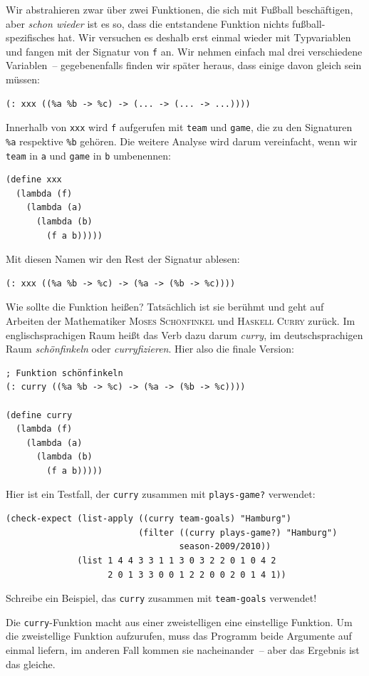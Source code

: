 Wir abstrahieren zwar über zwei Funktionen, die sich mit Fußball
beschäftigen, aber \emph{schon wieder} ist es so, dass die entstandene
Funktion nichts fußball-spezifisches hat.  Wir versuchen es deshalb
erst einmal wieder mit Typvariablen und fangen mit der Signatur von
\lstinline{f} an.  Wir nehmen einfach mal drei verschiedene
Variablen~-- gegebenenfalls finden wir später heraus, dass einige
davon gleich sein müssen:
%
\begin{lstlisting}
(: xxx ((%a %b -> %c) -> (... -> (... -> ...))))
\end{lstlisting}
%
Innerhalb von \lstinline{xxx} wird \lstinline{f} aufgerufen mit
\lstinline{team} und \lstinline{game}, die zu den Signaturen
\lstinline{%a} respektive \lstinline{%b} gehören.  Die weitere Analyse
wird darum vereinfacht, wenn wir \lstinline{team} in \lstinline{a} und
\lstinline{game} in \lstinline{b} umbenennen:
%
\begin{lstlisting}
(define xxx
  (lambda (f)
    (lambda (a)
      (lambda (b)
        (f a b)))))
\end{lstlisting}
%
Mit diesen Namen wir den Rest der Signatur ablesen:
%
\begin{lstlisting}
(: xxx ((%a %b -> %c) -> (%a -> (%b -> %c))))
\end{lstlisting}
%
Wie sollte die Funktion heißen?  Tatsächlich ist sie berühmt und geht
auf Arbeiten der Mathematiker \textsc{Moses Schönfinkel} und
\textsc{Haskell Curry} zurück.  Im englischsprachigen Raum heißt das
Verb dazu darum \textit{curry}, im deutschsprachigen Raum
\textit{schönfinkeln} oder
\textit{curryfizieren}.  Hier also die finale
Version:
%
\begin{lstlisting}
; Funktion schönfinkeln
(: curry ((%a %b -> %c) -> (%a -> (%b -> %c))))

(define curry
  (lambda (f)
    (lambda (a)
      (lambda (b)
        (f a b)))))
\end{lstlisting}
%
Hier ist ein Testfall, der \lstinline{curry} zusammen mit
\lstinline{plays-game?} verwendet:
%
\begin{lstlisting}
(check-expect (list-apply ((curry team-goals) "Hamburg")
                          (filter ((curry plays-game?) "Hamburg")
                                  season-2009/2010))
              (list 1 4 4 3 3 1 1 3 0 3 2 2 0 1 0 4 2
                    2 0 1 3 3 0 0 1 2 2 0 0 2 0 1 4 1))
\end{lstlisting}
%
\begin{aufgabeinline}
  Schreibe ein Beispiel, das \lstinline{curry} zusammen mit
  \lstinline{team-goals} verwendet!
\end{aufgabeinline}
%
Die \lstinline{curry}-Funktion macht aus einer zweistelligen eine
einstellige Funktion. Um die
zweistellige Funktion aufzurufen, muss das Programm beide Argumente
auf einmal liefern, im anderen Fall kommen sie nacheinander~-- aber
das Ergebnis ist das gleiche.

